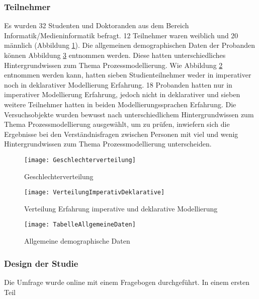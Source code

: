 \subsubsection{Teilnehmer}

Es wurden 32 Studenten und Doktoranden aus dem Bereich Informatik/Medieninformatik befragt. 12 Teilnehmer waren weiblich und 20 männlich (Abbildung \ref{fig:Geschlechterverteilung}). Die allgemeinen demographischen Daten der Probanden können Abbildung \ref{fig:TabelleAllgemeineDaten} entnommen werden. Diese hatten unterschiedliches Hintergrundwissen zum Thema Prozessmodellierung. Wie Abbildung \ref{fig:VerteilungImperativDeklarative} entnommen werden kann, hatten sieben Studienteilnehmer weder in imperativer noch in deklarativer Modellierung Erfahrung. 18 Probanden hatten nur in imperativer Modellierung Erfahrung, jedoch nicht in deklarativer und sieben weitere Teilnehmer hatten in beiden Modellierungssprachen Erfahrung. Die Versuchsobjekte wurden bewusst nach unterschiedlichem Hintergrundwissen zum Thema Prozessmodellierung ausgewählt, um zu prüfen, inwiefern sich die Ergebnisse bei den Verständnisfragen zwischen Personen mit viel und wenig Hintergrundwissen zum Thema Prozessmodellierung unterscheiden.\newline

\begin{figure}[htp]
\begin{center}
  \texttt{[image: Geschlechterverteilung]} %
  \caption{Geschlechterverteilung}
  \label{fig:Geschlechterverteilung}
\end{center}
\end{figure}

\begin{figure}[htp]
\begin{center}
  \texttt{[image: VerteilungImperativDeklarative]} %
  \caption{Verteilung Erfahrung imperative und deklarative Modellierung}
  \label{fig:VerteilungImperativDeklarative}
\end{center}
\end{figure}

\begin{figure}[htp]
\begin{center}
  \texttt{[image: TabelleAllgemeineDaten]} %
  \caption{Allgemeine demographische Daten}
  \label{fig:TabelleAllgemeineDaten}
\end{center}
\end{figure}









\subsubsection{Design der Studie}
Die Umfrage wurde online mit einem Fragebogen durchgeführt.
In einem ersten Teil
